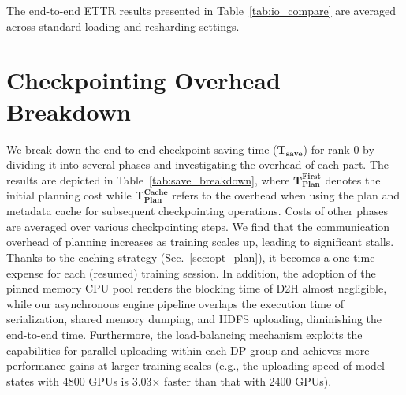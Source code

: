 The end-to-end ETTR results presented in Table~\ref{tab:io_compare} are averaged across standard loading and resharding settings.



\section{Checkpointing Overhead Breakdown}
\label{sec:save_breakdown}
We break down the end-to-end checkpoint saving time ($\mathbf{T_{save}}$) for rank 0 by dividing it into several phases and investigating the overhead of each part.
The results are depicted in Table~\ref{tab:save_breakdown}, where $\mathbf{T_{Plan}^{First}}$ denotes the initial planning cost while $\mathbf{T_{Plan}^{Cache}}$ refers to the overhead when using the plan and metadata cache for subsequent checkpointing operations.
Costs of other phases are averaged over various checkpointing steps.
We find that the communication overhead of planning increases as training scales up, leading to significant stalls. 
Thanks to the caching strategy (Sec.~\ref{sec:opt_plan}), it becomes a one-time expense for each (resumed) training session.
In addition, the adoption of the pinned memory CPU pool renders the blocking time of D2H almost negligible, while our asynchronous engine pipeline overlaps the execution time of serialization, shared memory dumping, and HDFS uploading, diminishing the end-to-end time.
Furthermore, the load-balancing mechanism exploits the capabilities for parallel uploading within each DP group and achieves more performance gains at larger training scales (e.g., the uploading speed of model states with 4800 GPUs is 3.03$\times$ faster than that with 2400 GPUs). 


